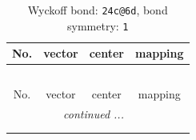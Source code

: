\documentclass[fleqn,8pt]{jsarticle}
\begin{document}
\renewcommand{\arraystretch}{1.2}
\begin{longtable}{cccc}
\caption{Wyckoff bond: {\tt 24c@6d}, bond symmetry: {\tt 1}}
 \\
 \hline \hline
No. & vector & center & mapping \\ \hline \endfirsthead

\multicolumn{3}{l}{\tablename\ \thetable{}} \\
 \hline \hline
No. & vector & center & mapping \\ \hline \endhead

 \hline \hline
\multicolumn{3}{r}{\footnotesize\it continued ...} \\ \endfoot

 \hline \hline
\multicolumn{3}{r}{} \\ \endlastfoot


\end{longtable}
\end{document}
